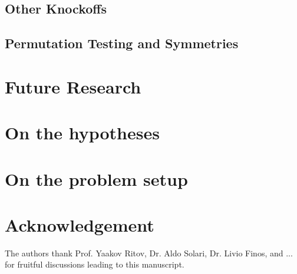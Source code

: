 \documentclass[article,lineno]{biometrika}
\begin{document}
\subsection{Other Knockoffs}



\subsection{Permutation Testing and Symmetries}



\section{Future Research}


\section{On the hypotheses}

\section{On the problem setup}



\section*{Acknowledgement}
The authors thank Prof. Yaakov Ritov, Dr. Aldo Solari, Dr. Livio Finos, and ... for fruitful discussions leading to this manuscript. 






\end{document}
